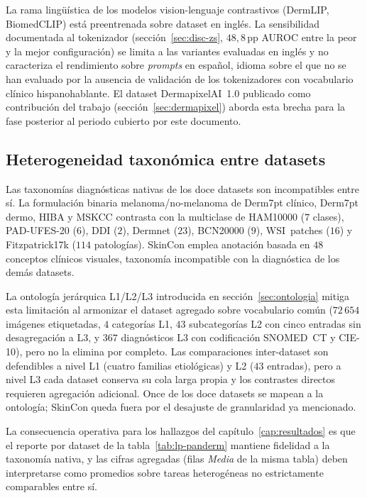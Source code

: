 La rama lingüística de los modelos vision-lenguaje contrastivos
(DermLIP, BiomedCLIP) está preentrenada sobre dataset en inglés. La
sensibilidad documentada al tokenizador (sección~\ref{sec:disc-zs},
$48{,}8$\,pp AUROC entre la peor y la mejor configuración) se
limita a las variantes evaluadas en inglés y no caracteriza el
rendimiento sobre \emph{prompts} en español, idioma sobre el que
no se han evaluado por la ausencia de validación de los
tokenizadores con vocabulario clínico hispanohablante. El dataset
DermapixelAI~1.0 publicado como contribución del trabajo
(sección~\ref{sec:dermapixel}) aborda esta brecha para la fase
posterior al periodo cubierto por este documento.

\subsection{Heterogeneidad taxonómica entre datasets}
\label{sec:lim-taxonomia}

Las taxonomías diagnósticas nativas de los doce datasets son
incompatibles entre sí. La formulación binaria
melanoma/no-melanoma de Derm7pt clínico, Derm7pt dermo, HIBA y
MSKCC contrasta con la multiclase de HAM10000 ($7$ clases),
PAD-UFES-20 ($6$), DDI ($2$), Dermnet ($23$), BCN20000
($9$), WSI~patches ($16$) y Fitzpatrick17k
($114$ patologías). SkinCon emplea anotación basada en
$48$ conceptos clínicos visuales, taxonomía incompatible con la
diagnóstica de los demás datasets.

La ontología jerárquica L1/L2/L3 introducida en
sección~\ref{sec:ontologia} mitiga esta limitación al armonizar el
dataset agregado sobre vocabulario común
($72\,654$ imágenes etiquetadas, $4$ categorías L1, $43$
subcategorías L2 con cinco entradas sin desagregación a L3, y
$367$ diagnósticos L3 con codificación SNOMED~CT y CIE-10), pero
no la elimina por completo. Las comparaciones inter-dataset son
defendibles a nivel L1 (cuatro familias etiológicas) y L2
($43$ entradas), pero a nivel L3 cada dataset conserva su cola
larga propia y los contrastes directos requieren agregación
adicional. Once de los doce datasets se mapean a la ontología;
SkinCon queda fuera por el desajuste de granularidad ya
mencionado.

La consecuencia operativa para los hallazgos del
capítulo~\ref{cap:resultados} es que el reporte por dataset de la
tabla~\ref{tab:lp-panderm} mantiene fidelidad a la taxonomía
nativa, y las cifras agregadas (filas \emph{Media} de la misma
tabla) deben interpretarse como promedios sobre tareas heterogéneas
no estrictamente comparables entre sí.

